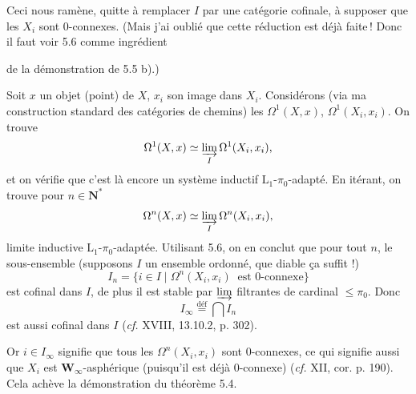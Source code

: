 Ceci nous ramène, quitte à remplacer $I$ par une catégorie cofinale, à supposer que les $X_i$ sont 0-connexes. (Mais j'ai oublié que cette réduction est déjà faite\,! Donc il faut voir 5.6 comme ingrédient


de la démonstration de 5.5 b).)

Soit $x$ un objet (point) de $X$, $x_i$ son image dans $X_i$. Considérons (via ma construction standard des catégories de chemins) les $\Omega^1(X,x)$, $\Omega^1(X_i,x_i)$. On trouve
\[ \Omega^1(X,x) \simeq \varinjlim_{I} \Omega^1(X_i,x_i), \]
et on vérifie que c'est là encore un système inductif $\mathrm{L}_1$-$\pi_0$-adapté. En itérant, on trouve pour $n \in \mathbf{N}^*$
\[ \Omega^n(X,x) \simeq \varinjlim_{I} \Omega^n(X_i,x_i), \]
limite inductive $\mathrm{L}_1$-$\pi_0$-adaptée. Utilisant 5.6, on en conclut que pour tout $n$, le sous-ensemble (supposons $I$ un ensemble ordonné, que diable ça suffit !)
\[ I_n = \{ i \in I \mid \Omega^n(X_i,x_i) \ \text{ est 0-connexe} \} \]
est cofinal dans $I$, de plus il est stable par $\varinjlim$ filtrantes de cardinal $\leq \pi_0$. Donc %
\[ I_\infty \overset{\text{déf}}{=} \bigcap I_n \]
est aussi cofinal dans $I$ (\textit{cf.} XVIII, 13.10.2, p. 302).

Or $i \in I_\infty$ signifie que tous les $\Omega^n(X_i,x_i)$ sont 0-connexes, ce qui signifie aussi que $X_i$ est $\mathbf{W}_\infty$-asphérique (puisqu'il est déjà 0-connexe) (\textit{cf.} XII, cor. p. 190). Cela achève la démonstration du théorème 5.4.


